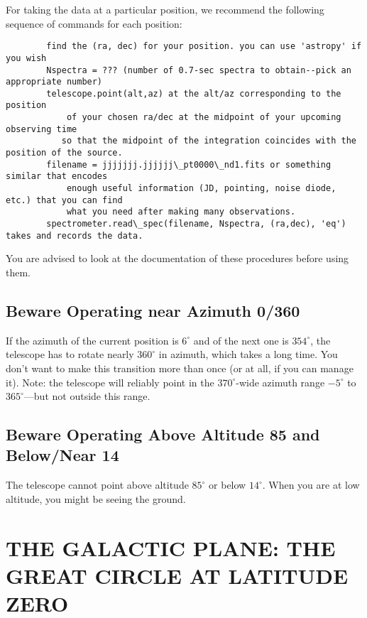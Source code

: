 \documentclass[psfig,preprint]{aastex}
\begin{document}
For taking the data at a particular position, we recommend the
following sequence of commands for each position:
\begin{verbatim}
        find the (ra, dec) for your position. you can use 'astropy' if you wish
        Nspectra = ??? (number of 0.7-sec spectra to obtain--pick an appropriate number)
        telescope.point(alt,az) at the alt/az corresponding to the position
            of your chosen ra/dec at the midpoint of your upcoming observing time
           so that the midpoint of the integration coincides with the position of the source.
        filename = jjjjjjj.jjjjjj\_pt0000\_nd1.fits or something similar that encodes
            enough useful information (JD, pointing, noise diode, etc.) that you can find
            what you need after making many observations.
        spectrometer.read\_spec(filename, Nspectra, (ra,dec), 'eq') takes and records the data.
\end{verbatim}
\noindent You are advised to look at the documentation of these procedures before using them.

\subsection{Beware Operating near Azimuth 0/360}

If the azimuth of the current position is $6^\circ$ and of the next one
is $354^\circ$, the telescope has to rotate nearly $360^\circ$ in azimuth,
which takes a long time. You don't want to make this transition more
than once (or at all, if you can manage it). Note: the telescope will
reliably point in the $370^\circ$-wide azimuth range $-5^\circ$ to
$365^\circ$---but not outside this range.

\subsection{Beware Operating Above Altitude 85 and Below/Near 14}

The telescope cannot point above altitude $85^\circ$ or 
below $14^\circ$. When you are at low altitude, you might be
seeing the ground.

\section{THE GALACTIC PLANE: THE GREAT CIRCLE AT LATITUDE ZERO 
} 
\label{galacticplane}
\end{document}
